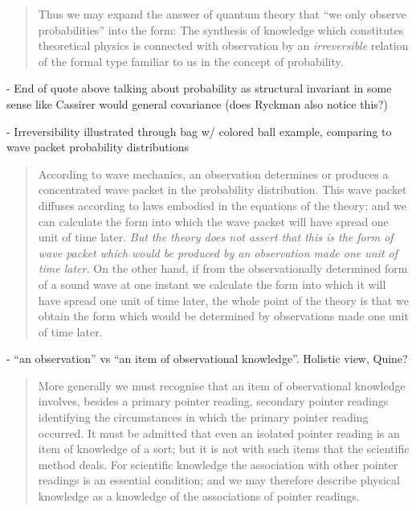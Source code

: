 \begin{quote}
    Thus we may expand the answer of quantum theory that ``we only observe probabilities'' into the form: The synthesis of knowledge which constitutes theoretical physics is connected with observation by an \emph{irreversible} relation of the formal type familiar to us in the concept of probability.
    \citep[p. 90-91]{Eddington1939}
\end{quote}

- End of quote above talking about probability as structural invariant in some sense like Cassirer would general covariance (does Ryckman also notice this?)

- Irreversibility illustrated through bag w/ colored ball example, comparing to wave packet probability distributions

\begin{quote}
    According to wave mechanics, an observation determines or produces a concentrated wave packet in the probability distribution.  This wave packet diffuses according to laws embodied in the equations of the theory; and we can calculate the form into which the wave packet will have spread one unit of time later.  \emph{But the theory does not assert that this is the form of wave packet which would be produced by an observation made one unit of time later.}  On the other hand, if from the observationally determined form of a sound wave at one instant we calculate the form into which it will have spread one unit of time later, the whole point of the theory is that we obtain the form which would be determined by observations made one unit of time later.  \citep[p. 93]{Eddington1939}
\end{quote}

- ``an observation'' vs ``an item of observational knowledge''.  Holistic view, Quine?

\begin{quote}
    More generally we must recognise that an item of observational knowledge involves, besides a primary pointer reading, secondary pointer readings identifying the circumstances in which the primary pointer reading occurred.  It must be admitted that even an isolated pointer reading is an item of knowledge of a sort; but it is not with such items that the scientific method deals.  For scientific knowledge the association with other pointer readings is an essential condition; and we may therefore describe physical knowledge as a knowledge of the associations of pointer readings.  \citep[p. 100]{Eddington1939}
\end{quote}

